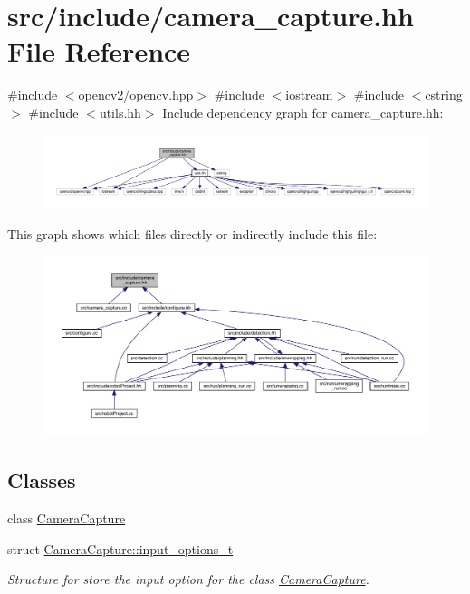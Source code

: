 \hypertarget{camera__capture_8hh}{}\section{src/include/camera\+\_\+capture.hh File Reference}
\label{camera__capture_8hh}
{\ttfamily \#include $<$opencv2/opencv.\+hpp$>$}\newline
{\ttfamily \#include $<$iostream$>$}\newline
{\ttfamily \#include $<$cstring$>$}\newline
{\ttfamily \#include $<$utils.\+hh$>$}\newline
Include dependency graph for camera\+\_\+capture.\+hh\+:
\nopagebreak
\begin{figure}[H]
\begin{center}
\leavevmode
\includegraphics[width=350pt]{camera__capture_8hh__incl}
\end{center}
\end{figure}
This graph shows which files directly or indirectly include this file\+:
\nopagebreak
\begin{figure}[H]
\begin{center}
\leavevmode
\includegraphics[width=350pt]{camera__capture_8hh__dep__incl}
\end{center}
\end{figure}
\subsection*{Classes}
\begin{DoxyCompactItemize}
\item 
class \mbox{\hyperlink{class_camera_capture}{Camera\+Capture}}
\item 
struct \mbox{\hyperlink{struct_camera_capture_1_1input__options__t}{Camera\+Capture\+::input\+\_\+options\+\_\+t}}
\begin{DoxyCompactList}\small\item\em Structure for store the input option for the class \mbox{\hyperlink{class_camera_capture}{Camera\+Capture}}. \end{DoxyCompactList}\end{DoxyCompactItemize}
